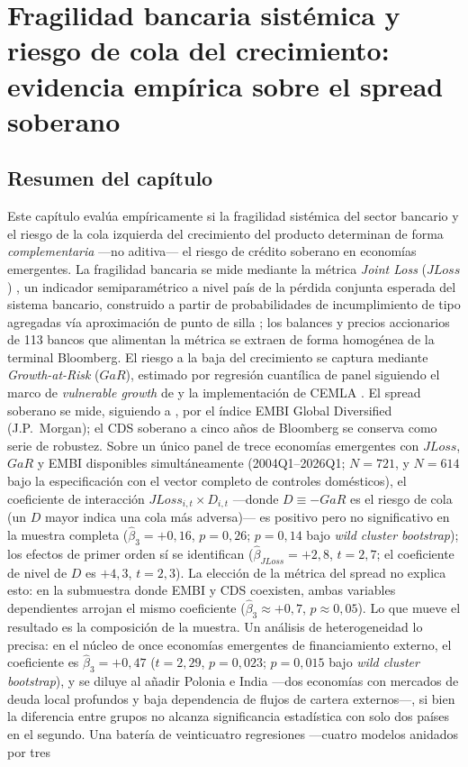 \chapter{Fragilidad bancaria sistémica y riesgo de cola del crecimiento: evidencia empírica sobre el spread soberano}
\label{chap:investigacion}

\section*{Resumen del capítulo}

Este capítulo evalúa empíricamente si la fragilidad sistémica del sector bancario y el riesgo de la cola izquierda del crecimiento del producto determinan de forma \emph{complementaria} —no aditiva— el riesgo de crédito soberano en economías emergentes. La fragilidad bancaria se mide mediante la métrica \textit{Joint Loss} ($JLoss$) \citep{Chari2024b}, un indicador semiparamétrico a nivel país de la pérdida conjunta esperada del sistema bancario, construido a partir de probabilidades de incumplimiento de tipo \citet{Merton1974b} agregadas vía aproximación de punto de silla \citep{MartinThompsonBrowne2001}; los balances y precios accionarios de 113 bancos que alimentan la métrica se extraen de forma homogénea de la terminal Bloomberg. El riesgo a la baja del crecimiento se captura mediante \textit{Growth-at-Risk} ($GaR$), estimado por regresión cuantílica de panel \citep{Koenker2004} siguiendo el marco de \textit{vulnerable growth} de \citet{ABG2019b} y la implementación de CEMLA \citep{OssandonBusch2022}. El spread soberano se mide, siguiendo a \citet{Chari2024b}, por el índice EMBI Global Diversified (J.P.\ Morgan); el CDS soberano a cinco años de Bloomberg se conserva como serie de robustez. Sobre un único panel de trece economías emergentes con $JLoss$, $GaR$ y EMBI disponibles simultáneamente (2004Q1--2026Q1; $N=721$, y $N=614$ bajo la especificación con el vector completo de controles domésticos), el coeficiente de interacción $JLoss_{i,t}\times D_{i,t}$ —donde $D\equiv-GaR$ es el riesgo de cola (un $D$ mayor indica una cola más adversa)— es positivo pero no significativo en la muestra completa ($\hat\beta_3=+0{,}16$, $p=0{,}26$; $p=0{,}14$ bajo \textit{wild cluster bootstrap}); los efectos de primer orden sí se identifican ($\hat\beta_{JLoss}=+2{,}8$, $t=2{,}7$; el coeficiente de nivel de $D$ es $+4{,}3$, $t=2{,}3$). La elección de la métrica del spread no explica esto: en la submuestra donde EMBI y CDS coexisten, ambas variables dependientes arrojan el mismo coeficiente ($\hat\beta_3\approx+0{,}7$, $p\approx0{,}05$). Lo que mueve el resultado es la composición de la muestra. Un análisis de heterogeneidad lo precisa: en el núcleo de once economías emergentes de financiamiento externo, el coeficiente es $\hat\beta_3=+0{,}47$ ($t=2{,}29$, $p=0{,}023$; $p=0{,}015$ bajo \textit{wild cluster bootstrap}), y se diluye al añadir Polonia e India —dos economías con mercados de deuda local profundos y baja dependencia de flujos de cartera externos—, si bien la diferencia entre grupos no alcanza significancia estadística con solo dos países en el segundo. Una batería de veinticuatro regresiones —cuatro modelos anidados por tres 